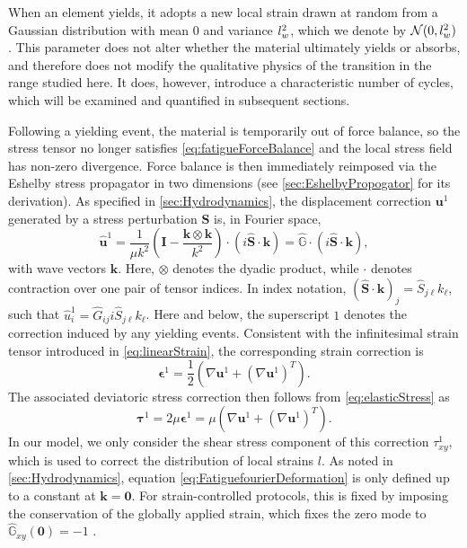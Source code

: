When an element yields, it adopts a new local strain drawn at random from a Gaussian distribution with mean $0$ and variance $l_w^2$, which we denote by $\mathcal{N}(0,l_w^2)$. This parameter does not alter whether the material ultimately yields or absorbs, and therefore does not modify the qualitative physics of the transition in the range studied here. It does, however, introduce a characteristic number of cycles, which will be examined and quantified in subsequent sections. 

Following a yielding event, the material is temporarily out of force balance, so the stress tensor no longer satisfies \cref{eq:fatigueForceBalance} and the local stress field has non-zero divergence. Force balance is then immediately reimposed via the Eshelby stress propagator in two dimensions \cite{picard_elastic_2004,eshelby_determination_1997} (see \cref{sec:EshelbyPropogator} for its derivation). As specified in \cref{sec:Hydrodynamics}, the displacement correction $\bm{u}^1$ generated by a stress perturbation $\bm{S}$ is, in Fourier space,
\begin{equation}
    \hat{\bm{u}}^1
    =
    \frac{1}{\mu k^2}
    \left(
        \bm{I}
        - \frac{\bm{k}\otimes\bm{k}}{k^2}
    \right)
    \cdot
    \left(i\hat{\bm{S}}\cdot\bm{k}\right)
    =
    \hat{\mathbb{G}}
    \cdot
    \left(i\hat{\bm{S}}\cdot\bm{k}\right),
    \label{eq:FatiguefourierDeformation}
\end{equation}
with wave vectors $\bm{k}$. Here, $\otimes$ denotes the dyadic product, while $\cdot$ denotes contraction over one pair of tensor indices. In index notation,
$(\hat{\bm{S}}\cdot\bm{k})_j=\hat{S}_{j\ell}k_\ell$, such that
$\hat{u}^1_i=\hat{G}_{ij}i\hat{S}_{j\ell}k_\ell$. Here and below, the superscript $1$ denotes the correction induced by any yielding events. Consistent with the infinitesimal strain tensor introduced in \cref{eq:linearStrain}, the corresponding strain correction is
\[
    \bm{\epsilon}^1 = \frac{1}{2}\left(\nabla \bm{u}^1 + (\nabla \bm{u}^1)^T\right).
\]
The associated deviatoric stress correction then follows from \cref{eq:elasticStress} as
\[
    \bm{\tau}^1 = 2\mu \bm{\epsilon}^1 = \mu\left(\nabla \bm{u}^1 + (\nabla \bm{u}^1)^T\right).
\]
In our model, we only consider the shear stress component of this correction $\tau^1_{xy}$, which is used to correct the distribution of local strains $l$. As noted in \cref{sec:Hydrodynamics}, equation \ref{eq:FatiguefourierDeformation} is only defined up to a constant at $\bm{k}=\bm{0}$. For strain-controlled protocols, this is fixed by imposing the conservation of the globally applied strain, which fixes the zero mode to $\hat{\mathbb{G}}_{xy}(\bm{0}) = -1$ \cite{nicolas_deformation_2018,martens_spontaneous_2012,jocteur_protocol_2025,lin_scaling_2014}.

